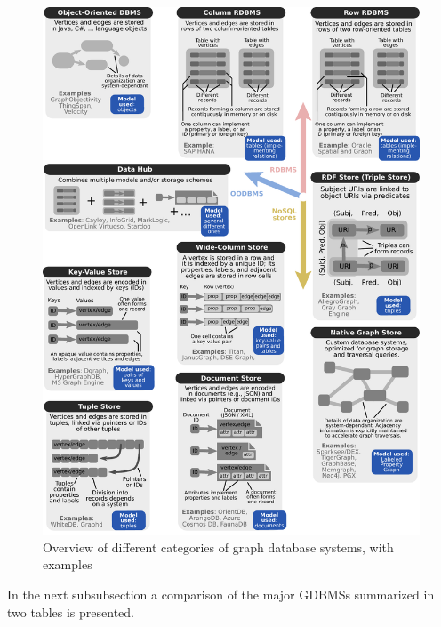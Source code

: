 \begin{figure}[H]%
	\centering%
	\includegraphics[width=1\textwidth,%
	]{images/chapter2/BestaPeterGerstenbergerFischerPodstawskiBarthelsAlonsoHoefler2019categoriespage11.pdf}%
	\caption[Overview of different categories of graph database systems, with examples]{Overview of different categories of graph database systems, with examples}%
	\label{fig:BestaPeterGerstenbergerFischerPodstawskiBarthelsAlonsoHoefler2019categoriespage11}%
\end{figure}%

In the next subsubsection a comparison of the major GDBMSs summarized in two tables is presented.

